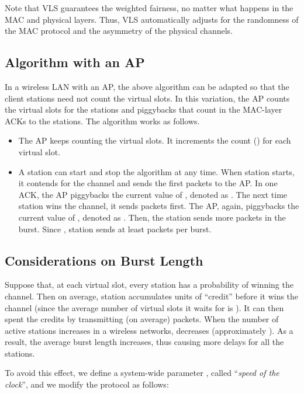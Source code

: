 \documentclass[letterpaper, 10 pt, conference]{ieeeconf}
\begin{document}
Note that VLS guarantees the weighted fairness, no matter what happens
in the MAC and physical layers. Thus, VLS automatically adjusts for
the randomness of the MAC protocol and the asymmetry of the physical channels.


\subsection{Algorithm with an AP}

In a wireless LAN with an AP, the above algorithm can be adapted so
that the client stations need not count the virtual slots. In this variation, 
the AP counts the virtual slots for the stations and piggybacks
that count in the MAC-layer ACKs to the stations. The algorithm
works as follows.

\begin{itemize}
\item The AP keeps counting the virtual slots. It increments the count () for each virtual slot.
\item A station can start and stop the algorithm at any time. When station
 starts, it contends for the channel and sends the first 
packets to the AP. In one ACK, the AP piggybacks the current value
of , denoted as . The next time station  wins
the channel, it sends  packets first. The AP, again, piggybacks
the current value of , denoted as . Then, the station
sends  more packets in the burst.
Since , station  sends at least
 packets per burst.
\end{itemize}

\subsection{Considerations on Burst Length}

Suppose that, at each virtual slot, every station  has a probability
 of winning the channel. Then on average, station  accumulates
 units of {}``credit'' before it wins the channel
(since the average number of virtual slots it waits for is ).
It can then spent the credits by transmitting (on average) 
packets. When the number of active stations  increases in a wireless
networks,  decreases (approximately ). As
a result, the average burst length increases, thus causing more
delays for all the stations.

To avoid this effect, we define a system-wide parameter , called ``{\em speed of the clock}'',  and we modify the protocol as follows:
\end{document}
